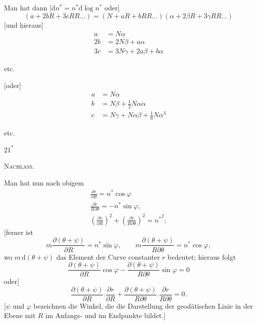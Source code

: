 Man hat dann [$\mathrm dn^*=n^*\mathrm d\log n^*$ oder]
\[
(a+2bR+3cRR\ldots)=(N+aR+bRR\ldots)(\alpha+2\beta R+3\gamma RR\ldots)
\]
[und hieraus]
\[
\begin{aligned}
a&=N\alpha\\
2b&=2N\beta+a\alpha\\
3c&=3N\gamma+2a\beta+b\alpha
\end{aligned}
\]
\begin{center}etc.\end{center}
[oder]
\[
\begin{aligned}
a&=N\alpha\\
b&=N\beta+\tfrac12N\alpha\alpha\\
c&=N\gamma+N\alpha\beta+\tfrac16N\alpha^3
\end{aligned}
\]
\begin{center}etc.\end{center}
\vfill\hfill$21^*$\hspace*{2cm}\par
\clearpage
{}\hfill\textsc{Nachlass.}\hfill\mbox{}\par\medskip
\begingroup\small
Man hat nun nach obigem
\[
\begin{gathered}
\frac{\partial r}{\partial R}=n^*\cos\varphi\\
\frac{\partial r}{R\partial\theta}=-n^*\sin\varphi,\\
\left(\frac{\partial r}{\partial R}\right)^2+\left(\frac{\partial r}{R\partial\theta}\right)^2={n^*}^2;
\end{gathered}
\]
[ferner ist
\[
m\frac{\partial(\theta+\psi)}{\partial R}=n^*\sin\varphi,\qquad m\frac{\partial(\theta+\psi)}{R\partial\theta}=n^*\cos\varphi,
\]
wo $m\,\mathrm d(\theta+\psi)$ das Element der Curve constanter $r$ bedeutet; hieraus folgt
\[
\frac{\partial(\theta+\psi)}{\partial R}\cos\varphi-\frac{\partial(\theta+\psi)}{R\partial\theta}\sin\varphi=0
\]
oder]
\[
\frac{\partial(\theta+\psi)}{\partial R}.\frac{\partial r}{\partial R}+\frac{\partial(\theta+\psi)}{R\partial\theta}.\frac{\partial r}{R\partial\theta}=0.
\]
[$\psi$ und $\varphi$ bezeichnen die Winkel, die die Darstellung der geodätischen Linie in der Ebene mit $R$ im Anfangs- und im Endpunkte bildet.]


